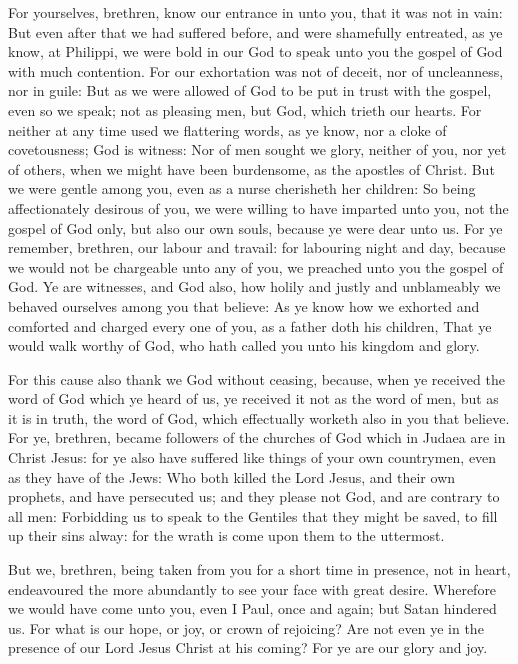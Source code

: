  For yourselves, brethren, know our entrance in unto you,
that it was not in vain:  But even after that we had
suffered before, and were shamefully entreated, as ye know, at Philippi,
we were bold in our God to speak unto you the gospel of God with much
contention.  For our exhortation was not of deceit, nor of
uncleanness, nor in guile:  But as we were allowed of God
to be put in trust with the gospel, even so we speak; not as pleasing
men, but God, which trieth our hearts.  For neither at any
time used we flattering words, as ye know, nor a cloke of covetousness;
God is witness:  Nor of men sought we glory, neither of
you, nor yet of others, when we might have been burdensome, as the
apostles of Christ.  But we were gentle among you, even as
a nurse cherisheth her children:  So being affectionately
desirous of you, we were willing to have imparted unto you, not the
gospel of God only, but also our own souls, because ye were dear unto
us.  For ye remember, brethren, our labour and travail:
for labouring night and day, because we would not be chargeable unto any
of you, we preached unto you the gospel of God.  Ye are
witnesses, and God also, how holily and justly and unblameably we
behaved ourselves among you that believe:  As ye know how
we exhorted and comforted and charged every one of you, as a father doth
his children,  That ye would walk worthy of God, who hath
called you unto his kingdom and glory.

 For this cause also thank we God without ceasing,
because, when ye received the word of God which ye heard of us, ye
received it not as the word of men, but as it is in truth, the word of
God, which effectually worketh also in you that believe. 
For ye, brethren, became followers of the churches of God which in
Judaea are in Christ Jesus: for ye also have suffered like things of
your own countrymen, even as they have of the Jews:  Who
both killed the Lord Jesus, and their own prophets, and have persecuted
us; and they please not God, and are contrary to all men:
 Forbidding us to speak to the Gentiles that they might
be saved, to fill up their sins alway: for the wrath is come upon them
to the uttermost.

 But we, brethren, being taken from you for a short time
in presence, not in heart, endeavoured the more abundantly to see your
face with great desire.  Wherefore we would have come
unto you, even I Paul, once and again; but Satan hindered us.
 For what is our hope, or joy, or crown of rejoicing? Are
not even ye in the presence of our Lord Jesus Christ at his coming?
 For ye are our glory and joy.

